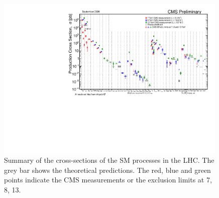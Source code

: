 \begin{figure}[ht]
    \centering
    \includegraphics[width=0.99\textwidth]{chapters/Physics/sectionPPCollision/figures/SigmaNew_v0.pdf}
    \caption{Summary of the cross-sections of the SM processes in the LHC. The grey bar shows the theoretical predictions. The red, blue and green points indicate the CMS measurements or the exclusion limits at 7, 8, 13\TeV.}
    \label{fig:physics:ppCollision:hardxs}
\end{figure}



